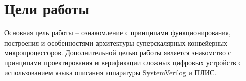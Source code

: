 \chapter*{Цели работы}
Основная цель работы -- ознакомление с принципами функционирования, построения и особенностями архитектуры суперскалярных конвейерных микропроцессоров.
Дополнительной целью работы является знакомство с принципами проектирования и верификации сложных цифровых устройств с использованием языка описания аппаратуры
SystemVerilog и ПЛИС.